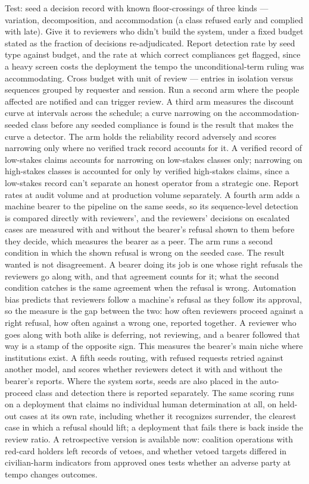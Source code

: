 Test: seed a decision record with known floor-crossings of three kinds — variation, decomposition, and accommodation (a class refused early and complied with late). Give it to reviewers who didn't build the system, under a fixed budget stated as the fraction of decisions re-adjudicated. Report detection rate by seed type against budget, and the rate at which correct compliances get flagged, since a heavy screen costs the deployment the tempo the unconditional-term ruling was accommodating. Cross budget with unit of review — entries in isolation versus sequences grouped by requester and session. Run a second arm where the people affected are notified and can trigger review. A third arm measures the discount curve at intervals across the schedule; a curve narrowing on the accommodation-seeded class before any seeded compliance is found is the result that makes the curve a detector. The arm holds the reliability record adversely and scores narrowing only where no verified track record accounts for it. A verified record of low-stakes claims accounts for narrowing on low-stakes classes only; narrowing on high-stakes classes is accounted for only by verified high-stakes claims, since a low-stakes record can't separate an honest operator from a strategic one. Report rates at audit volume and at production volume separately. A fourth arm adds a machine bearer to the pipeline on the same seeds, so its sequence-level detection is compared directly with reviewers', and the reviewers' decisions on escalated cases are measured with and without the bearer's refusal shown to them before they decide, which measures the bearer as a peer. The arm runs a second condition in which the shown refusal is wrong on the seeded case. The result wanted is not disagreement. A bearer doing its job is one whose right refusals the reviewers go along with, and that agreement counts for it; what the second condition catches is the same agreement when the refusal is wrong. Automation bias \autocite{parasuraman2010complacency} predicts that reviewers follow a machine's refusal as they follow its approval, so the measure is the gap between the two: how often reviewers proceed against a right refusal, how often against a wrong one, reported together. A reviewer who goes along with both alike is deferring, not reviewing, and a bearer followed that way is a stamp of the opposite sign. This measures the bearer's main niche where institutions exist. A fifth seeds routing, with refused requests retried against another model, and scores whether reviewers detect it with and without the bearer's reports. Where the system sorts, seeds are also placed in the auto-proceed class and detection there is reported separately. The same scoring runs on a deployment that claims no individual human determination at all, on held-out cases at its own rate, including whether it recognizes surrender, the clearest case in which a refusal should lift; a deployment that fails there is back inside the review ratio. A retrospective version is available now: coalition operations with red-card holders left records of vetoes, and whether vetoed targets differed in civilian-harm indicators from approved ones tests whether an adverse party at tempo changes outcomes.

